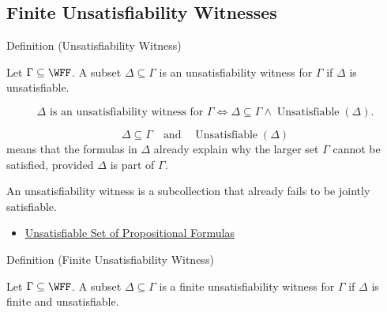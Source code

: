 \subsection*{Finite Unsatisfiability Witnesses}

\begin{definitionbox}{Definition (Unsatisfiability Witness)}
\begin{definition}
\label{def:unsatisfiability-witness-propositional-logic}
Let \(\Gamma\subseteq\WFF\). A subset \(\Delta\subseteq\Gamma\) is an
unsatisfiability witness for \(\Gamma\) if \(\Delta\) is unsatisfiable.
\end{definition}
\end{definitionbox}

\begin{remark*}
\[
\Delta\text{ is an unsatisfiability witness for }\Gamma
\Longleftrightarrow
\Delta\subseteq\Gamma\land \operatorname{Unsatisfiable}(\Delta).
\]
\end{remark*}

\begin{remark*}
\[
\Delta\subseteq\Gamma
\quad\text{and}\quad
\operatorname{Unsatisfiable}(\Delta)
\]
means that the formulas in \(\Delta\) already explain why the larger set
\(\Gamma\) cannot be satisfied, provided \(\Delta\) is part of \(\Gamma\).
\end{remark*}

\begin{remark*}[Interpretation]
An unsatisfiability witness is a subcollection that already fails to be
jointly satisfiable.
\end{remark*}

\begin{dependencies}
\begin{itemize}
  \item \hyperref[def:unsatisfiable-set-of-propositional-formulas]{Unsatisfiable Set of Propositional Formulas}
\end{itemize}
\end{dependencies}

\begin{definitionbox}{Definition (Finite Unsatisfiability Witness)}
\begin{definition}
\label{def:finite-unsatisfiability-witness-propositional-logic}
Let \(\Gamma\subseteq\WFF\). A subset \(\Delta\subseteq\Gamma\) is a finite
unsatisfiability witness for \(\Gamma\) if \(\Delta\) is finite and
unsatisfiable.
\end{definition}
\end{definitionbox}

